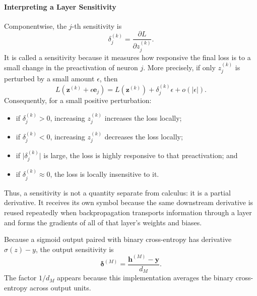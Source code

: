 \documentclass{article}
\begin{document}
\paragraph{Interpreting a Layer Sensitivity}
Componentwise, the \(j\)-th sensitivity is
\[
  \delta_j^{(k)}
  =
  \frac{\partial L}{\partial z_j^{(k)}}.
\]
It is called a sensitivity because it measures how responsive the final
loss is to a small change in the preactivation of neuron \(j\). More
precisely, if only \(z_j^{(k)}\) is perturbed by a small amount
\(\epsilon\), then
\[
  L\!\left(
    \mathbf{z}^{(k)}+\epsilon\mathbf{e}_j
  \right)
  =
  L\!\left(\mathbf{z}^{(k)}\right)
  +
  \delta_j^{(k)}\epsilon
  +
  o\!\left(\lvert\epsilon\rvert\right).
\]
Consequently, for a small positive perturbation:
\begin{itemize}
  \item if \(\delta_j^{(k)}>0\), increasing \(z_j^{(k)}\) increases the
  loss locally;
  \item if \(\delta_j^{(k)}<0\), increasing \(z_j^{(k)}\) decreases the
  loss locally;
  \item if \(\lvert\delta_j^{(k)}\rvert\) is large, the loss is highly
  responsive to that preactivation; and
  \item if \(\delta_j^{(k)}\approx0\), the loss is locally insensitive
  to it.
\end{itemize}
Thus, a sensitivity is not a quantity separate from calculus: it is a
partial derivative. It receives its own symbol because the same
downstream derivative is reused repeatedly when backpropagation
transports information through a layer and forms the gradients of all
of that layer's weights and biases.

Because a sigmoid output paired with binary cross-entropy has derivative
\(\sigma(z)-y\), the output sensitivity is
\[
  \boxed{
    \boldsymbol{\delta}^{(M)}
    =
    \frac{\mathbf{h}^{(M)}-\mathbf{y}}{d_M}.
  }
\]
The factor \(1/d_M\) appears because this implementation averages the
binary cross-entropy across output units.
\end{document}
